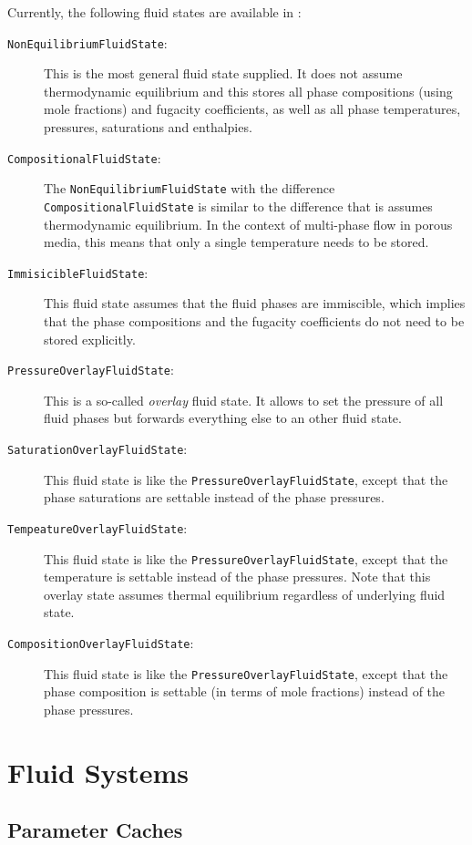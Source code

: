 Currently, the following fluid states are available in \Dumux:
\begin{description}
\item[\texttt{NonEquilibriumFluidState}:] This is the most general
  fluid state supplied. It does not assume thermodynamic equilibrium
  and this stores all phase compositions (using mole fractions) and
  fugacity coefficients, as well as all phase temperatures, pressures,
  saturations and enthalpies.
\item[\texttt{CompositionalFluidState}:] The
  \texttt{NonEquilibriumFluidState} with the difference
  \texttt{CompositionalFluidState} is similar to the difference that
  is assumes thermodynamic equilibrium. In the context of multi-phase
  flow in porous media, this means that only a single temperature
  needs to be stored.
\item[\texttt{ImmisicibleFluidState}:] This fluid state assumes that
  the fluid phases are immiscible, which implies that the phase
  compositions and the fugacity coefficients do not need to be stored
  explicitly.
\item[\texttt{PressureOverlayFluidState}:] This is a so-called {\em
    overlay} fluid state. It allows to set the pressure of all fluid
  phases but forwards everything else to an other fluid state.
\item[\texttt{SaturationOverlayFluidState}:] This fluid state is like
  the \texttt{PressureOverlayFluidState}, except that the phase
  saturations are settable instead of the phase pressures.
\item[\texttt{TempeatureOverlayFluidState}:] This fluid state is like
  the \texttt{PressureOverlayFluidState}, except that the temperature
  is settable instead of the phase pressures. Note that this overlay
  state assumes thermal equilibrium regardless of underlying fluid
  state.
\item[\texttt{CompositionOverlayFluidState}:] This fluid state is like
  the \texttt{PressureOverlayFluidState}, except that the phase
  composition is settable (in terms of mole fractions) instead of the
  phase pressures.
\end{description}

\section{Fluid Systems}

\subsection{Parameter Caches}


